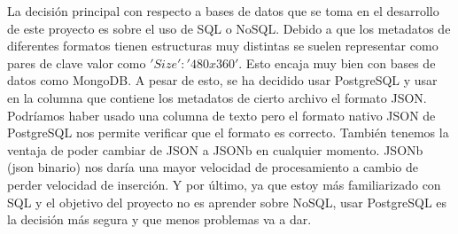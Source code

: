 La decisión principal con respecto a bases de datos que se toma en el desarrollo de este proyecto es sobre el uso de SQL o NoSQL. Debido a que los metadatos de diferentes formatos tienen estructuras muy distintas se suelen representar como pares de clave valor como $'Size': '480x360'$. Esto encaja muy bien con bases de datos como MongoDB. A pesar de esto, se ha decidido usar PostgreSQL y usar en la columna que contiene los metadatos de cierto archivo el formato JSON. Podríamos haber usado una columna de texto pero el formato nativo JSON de PostgreSQL nos permite verificar que el formato es correcto. También tenemos la ventaja de poder cambiar de JSON a JSONb en cualquier momento. JSONb (json binario) nos daría una mayor velocidad de procesamiento a cambio de perder velocidad de inserción. Y por último, ya que estoy más familiarizado con SQL y el objetivo del proyecto no es aprender sobre NoSQL, usar PostgreSQL es la decisión más segura y que menos problemas va a dar.